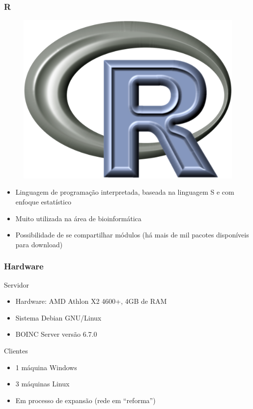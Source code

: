 \documentclass{beamer}
\begin{document}
\begin{frame}
  \frametitle{R}
  \begin{figure}
    \includegraphics[scale=0.25]{R.png}
  \end{figure}
  \begin{itemize}
    \item Linguagem de programação interpretada, baseada na linguagem S e com enfoque estatístico
    \item Muito utilizada na área de bioinformática
    \item Possibilidade de se compartilhar módulos (há mais de mil pacotes disponíveis para download) 
  \end{itemize}

\end{frame}

\begin{frame}
  \frametitle{Hardware}
  \begin{block}{Servidor}
    \begin{itemize}
      \item Hardware: AMD Athlon X2 4600+, 4GB de RAM %
      \item Sistema Debian GNU/Linux
      \item BOINC Server versão 6.7.0
    \end{itemize}
  \end{block}
  \begin{block}{Clientes}
  \begin{itemize}
    \item 1 máquina Windows
    \item 3 máquinas Linux
    \item Em processo de expansão (rede em ``reforma'')
  \end{itemize}
  \end{block}
\end{frame}
\end{document}
